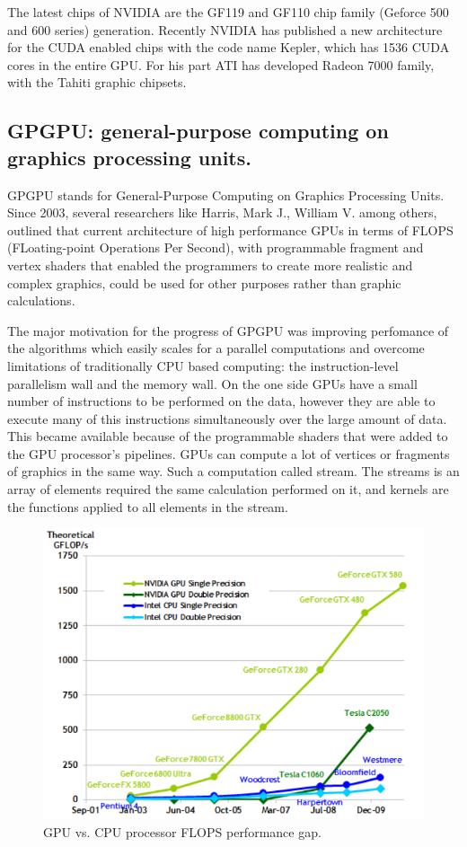 \documentclass[thesis=M,english]{FITthesis}[2011/07/15]
\begin{document}
The latest chips of NVIDIA are the GF119 and GF110 chip family (Geforce 500 and 600 series) generation. Recently NVIDIA has published a new architecture for the CUDA enabled chips with the code name Kepler, which has 1536 CUDA cores in the entire GPU. For his part ATI has developed Radeon 7000 family, with the Tahiti graphic chipsets.

\subsection{GPGPU: general-purpose computing on graphics processing units.}
GPGPU stands for General-Purpose Computing on Graphics Processing Units. Since 2003, several researchers like Harris, Mark J., William V. among others, outlined that current architecture of high performance GPUs in terms of FLOPS (FLoating-point Operations Per Second), with programmable fragment and vertex shaders that enabled the programmers to create more realistic and complex graphics, could be used for other purposes rather than graphic calculations.

The major motivation for the progress of GPGPU was improving perfomance of the algorithms which easily scales for a parallel computations and overcome limitations of traditionally CPU based computing: the instruction-level parallelism wall and the memory wall. On the one side GPUs have a small number of instructions to be performed on the data, however they are able to execute many of this instructions simultaneously over the large amount of data. This became available because of the programmable shaders that were added to the GPU processor's pipelines. GPUs can compute a lot of vertices or fragments of graphics in the same way. Such a computation called stream. The streams is an array of elements required the same calculation performed on it, and kernels are the functions applied to all elements in the stream.

\begin{figure}[h]
\centering
\includegraphics[scale=0.45]{images/cpuvsgpu.png}
\caption{GPU vs. CPU processor FLOPS performance gap.}
\label{fig:cpuvsgpu}
\end{figure}
\end{document}
